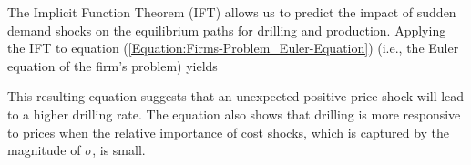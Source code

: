 The Implicit Function Theorem (IFT) allows us to predict the impact of sudden demand shocks on the equilibrium paths for drilling and production. Applying the IFT to equation (\ref{Equation:Firms-Problem_Euler-Equation}) (i.e., the Euler equation of the firm's problem) yields

This resulting equation suggests that an unexpected positive price shock will lead to a higher drilling rate. The equation also shows that drilling is more responsive to prices when the relative importance of cost shocks, which is captured by the magnitude of $\sigma$, is small. 
